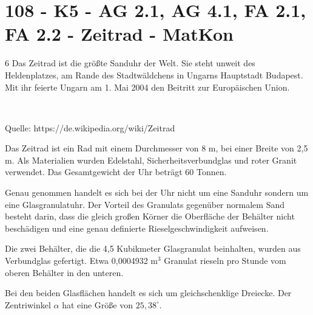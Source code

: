 \section{108 - K5 - AG 2.1, AG 4.1, FA 2.1, FA 2.2 - Zeitrad - MatKon}

\begin{langesbeispiel} \item[6] %
Das Zeitrad ist die größte Sanduhr der Welt. Sie steht unweit des Heldenplatzes, am Rande des Stadtwäldchens in Ungarns Hauptstadt Budapest. Mit ihr feierte Ungarn am 1. Mai 2004 den Beitritt zur Europäischen Union.
		
\begin{center}
\\
\begin{footnotesize}
Quelle: https://de.wikipedia.org/wiki/Zeitrad
\end{footnotesize}	
\end{center}

	
		
	Das Zeitrad ist ein Rad mit einem Durchmesser von 8 m, bei einer Breite von 2,5 m. Als Materialien wurden Edelstahl, Sicherheitsverbundglas und roter Granit verwendet. Das Gesamtgewicht der Uhr beträgt 60 Tonnen.
	
	Genau genommen handelt es sich bei der Uhr nicht um eine Sanduhr sondern um eine Glasgranulatuhr. Der Vorteil des Granulats gegenüber normalem Sand besteht darin, dass die gleich großen Körner die Oberfläche der Behälter nicht beschädigen und eine genau definierte Rieselgeschwindigkeit aufweisen.
	
	Die zwei Behälter, die die 4,5 Kubikmeter Glasgranulat beinhalten, wurden aus Verbundglas gefertigt. Etwa 0,0004932 m$^3$ Granulat rieseln pro Stunde vom oberen Behälter in den unteren.%

\begin{aufgabenstellung}
\item %


\item Bei den beiden Glasflächen handelt es sich um gleichschenklige Dreiecke. Der Zentriwinkel $\alpha$ hat eine Größe von $25,38^\circ$. 
	

\end{aufgabenstellung}
\end{langesbeispiel}
